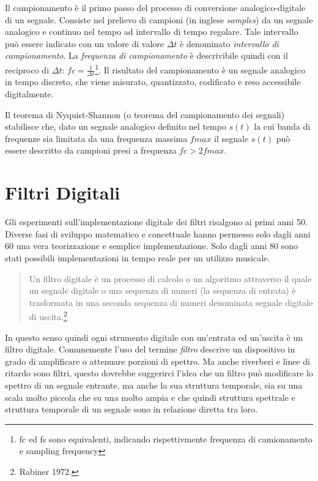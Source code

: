 Il campionamento è il primo passo del processo di conversione analogico-digitale
di un segnale. Consiste nel prelievo di campioni (in inglese \emph{samples}) da
un segnale analogico e continuo nel tempo ad intervallo di tempo regolare.
Tale intervallo può essere indicato con un valore di valore $ \Delta t $ è denominato
\emph{intervallo di campionamento}. La \emph{frequenza di campionamento} è
descrivibile quindi con il reciproco di
$ \Delta t $: $ fc = \frac{1}{\Delta t} $\footnote{fc ed fs sono equivalenti,
indicando rispettivmente frequenza di camionamento e sampling frequency}.
Il risultato del campionamento è un segnale analogico in tempo discreto,
che viene misurato, quantizzato, codificato e reso accessibile digitalmente.

Il teorema di Nyquist-Shannon (o teorema del campionamento dei segnali) stabilisce
che, dato un segnale analogico definito nel tempo $ s(t) $ la cui banda di frequenze
sia limitata da una frequenza massima $fmax$ il segnale $ s(t) $ può essere descritto
da campioni presi a frequenza $ fc > 2fmax $.

\section{Filtri Digitali}

Gli esperimenti sull'implementazione digitale dei filtri risalgono ai primi anni 50.
Diverse fasi di sviluppo matematico e concettuale hanno permesso solo dagli anni 60
una vera teorizzazione e semplice implementazione. Solo dagli anni 80 sono stati
possibili implementazioni in tempo reale per un utilizzo musicale.

\begin{quote}
  Un filtro digitale è un processo di calcolo o un algoritmo attraverso il quale
  un segnale digitale o una sequenza di numeri (la sequenza di entrata) è
  trasformata in una seconda sequenza di numeri denominata segnale digitale di
  uscita.\footnote{Rabiner 1972.}
\end{quote}

In questo senso quindi ogni strumento digitale con un'entrata ed un'uscita è un
filtro digitale. Comunemente l'uso del termine \emph{filtro} descrive un dispositivo
in grado di amplificare o attenuare porzioni di spettro. Ma anche riverberi e linee
di ritardo sono filtri, questo dovrebbe suggerirci l'idea che un filtro può
modificare lo spettro di un segnale entrante, ma anche la sua struttura temporale,
sia su una scala molto piccola che su una molto ampia e che quindi struttura
spettrale e struttura temporale di un segnale sono in relazione diretta tra loro.


